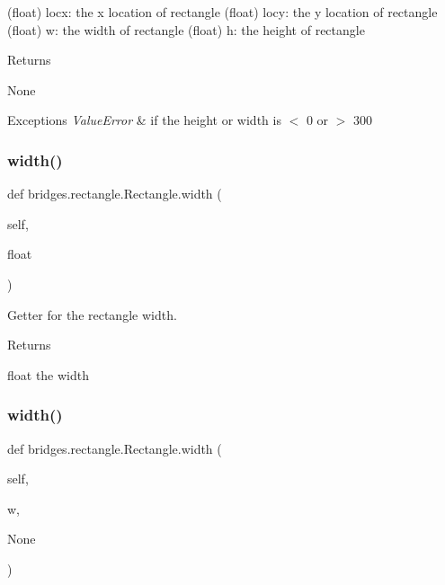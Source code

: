 (float) locx\+: the x location of rectangle (float) locy\+: the y location of rectangle (float) w\+: the width of rectangle (float) h\+: the height of rectangle \begin{DoxyReturn}{Returns}


None
\end{DoxyReturn}

\begin{DoxyExceptions}{Exceptions}
{\em Value\+Error} & if the height or width is $<$ 0 or $>$ 300 \\
\hline
\end{DoxyExceptions}
\mbox{\label{classbridges_1_1rectangle_1_1_rectangle_a862f1154bb5e73c1811c38e7871f93a5}} 
\subsubsection{\texorpdfstring{width()}{width()}\hspace{0.1cm}{\footnotesize\ttfamily [1/2]}}
{\footnotesize\ttfamily def bridges.\+rectangle.\+Rectangle.\+width (\begin{DoxyParamCaption}\item[{}]{self,  }\item[{}]{float }\end{DoxyParamCaption})}



Getter for the rectangle width. 

\begin{DoxyReturn}{Returns}


float the width 
\end{DoxyReturn}
\mbox{\label{classbridges_1_1rectangle_1_1_rectangle_a6b4b58e7312278fdc5d314bd574096bc}} 
\subsubsection{\texorpdfstring{width()}{width()}\hspace{0.1cm}{\footnotesize\ttfamily [2/2]}}
{\footnotesize\ttfamily def bridges.\+rectangle.\+Rectangle.\+width (\begin{DoxyParamCaption}\item[{}]{self,  }\item[{}]{w,  }\item[{}]{None }\end{DoxyParamCaption})}



